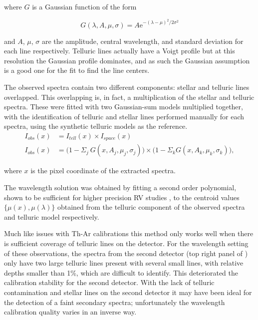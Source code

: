where \(G \) is a Gaussian function of the form

\begin{equation}
G(\lambda, A, \mu, \sigma) = {A \textrm{e}}^{{-(\lambda-\mu)}^{2}/2\sigma^{2}}
\end{equation}

and \(A \), \(\mu \), \(\sigma \) are the amplitude, central wavelength, and standard deviation for each line respectively. Telluric lines actually have a  Voigt profile but at this resolution the Gaussian profile dominates, and as such the Gaussian assumption is a good one for the fit to find the line centers.

The observed spectra contain two different components: stellar and telluric lines overlapped. This overlapping is, in fact, a multiplication of the stellar and telluric spectra. These were fitted with two Gaussian-sum models multiplied together, with the identification of telluric and stellar lines performed manually for each spectra, using the synthetic telluric models as the reference.
\begin{align}
I_{obs}(x) &= I_{tell}(x) \times I_{space}(x) \nonumber \\
I_{obs}(x) &= \Big(1 - {\Sigma}_{j}\ G(x, A_{j}, {\mu}_{j}, {\sigma}_{j})\Big) \times \Big(1 - {\Sigma}_{k} G(x, A_{k}, {\mu}_{k}, {\sigma}_{k})\Big), \label{eqn:obs}
\end{align}

where \(x \) is the pixel coordinate of the extracted spectra.

The wavelength solution was obtained by fitting a second order polynomial, shown to be sufficient for higher precision RV studies \citep[e.g.][]{bean_groundbased_2010, figueira_radial_2010}, to the centroid values \(\{\mu(x), \mu(\lambda)\} \) obtained from the telluric component of the observed spectra and telluric model respectively. 

Much like issues with Th-Ar calibrations this method only works well when there is sufficient coverage of telluric lines on the detector. For the wavelength setting of these observations, the spectra from the second detector (top right panel of ) only have two large telluric lines present with several small lines, with relative depths smaller than 1\%, which are difficult to identify. This deteriorated the calibration stability for the second detector. With the lack of telluric contamination and stellar lines on the second detector it may have been ideal for the detection of a faint secondary spectra; unfortunately the wavelength calibration quality varies in an inverse way.

